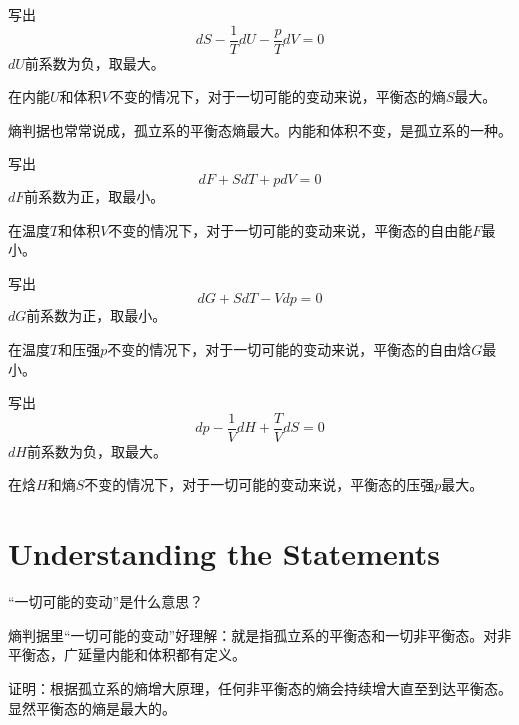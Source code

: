 \documentclass[CJK]{beamer}
\begin{document}
\begin{frame}
\bch
写出
$$dS - \frac{1}{T} dU - \frac{p}{T} dV = 0 $$
$dU$前系数为负，取最大。

在内能$U$和体积$V$不变的情况下，对于一切可能的变动来说，平衡态的熵$S$最大。

\skiplines

熵判据也常常说成，孤立系的平衡态熵最大。内能和体积不变，是孤立系的一种。
\ech
\end{frame}


\begin{frame}
\bch
写出
$$dF  + S dT + p dV = 0 $$
$dF$前系数为正，取最小。


在温度$T$和体积$V$不变的情况下，对于一切可能的变动来说，平衡态的自由能$F$最小。

\ech
\end{frame}


\begin{frame}
\bch
写出
$$dG + S dT - V dp = 0$$
$dG$前系数为正，取最小。

在温度$T$和压强$p$不变的情况下，对于一切可能的变动来说，平衡态的自由焓$G$最小。

\ech
\end{frame}


\begin{frame}
\bch
写出
$$dp - \frac{1}{V} dH + \frac{T}{V} dS = 0$$
$dH$前系数为负，取最大。

在焓$H$和熵$S$不变的情况下，对于一切可能的变动来说，平衡态的压强$p$最大。

\ech
\end{frame}


\section{Understanding the Statements}

\begin{frame}
\bch
“一切可能的变动”是什么意思？

\ech
\end{frame}

\begin{frame}
\bch
熵判据里“一切可能的变动”好理解：就是指孤立系的平衡态和一切非平衡态。对非平衡态，广延量内能和体积都有定义。



证明：根据孤立系的熵增大原理，任何非平衡态的熵会持续增大直至到达平衡态。显然平衡态的熵是最大的。

\ech
\end{frame}
\end{document}
